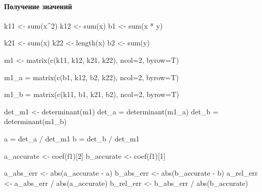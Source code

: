 \documentclass[
  letterpaper,
  DIV=11,
  numbers=noendperiod]{scrartcl}
\let\oldparagraph\paragraph
\renewcommand{\paragraph}[1]{\oldparagraph{#1}\mbox{}}
\newenvironment{Shaded}{\begin{snugshade}}{\end{snugshade}}
\newcommand{\AttributeTok}[1]{\textcolor[rgb]{0.40,0.45,0.13}{#1}}
\newcommand{\DecValTok}[1]{\textcolor[rgb]{0.68,0.00,0.00}{#1}}
\newcommand{\FunctionTok}[1]{\textcolor[rgb]{0.28,0.35,0.67}{#1}}
\newcommand{\NormalTok}[1]{\textcolor[rgb]{0.00,0.23,0.31}{#1}}
\newcommand{\OtherTok}[1]{\textcolor[rgb]{0.00,0.23,0.31}{#1}}
\newcommand{\SpecialCharTok}[1]{\textcolor[rgb]{0.37,0.37,0.37}{#1}}
\begin{document}
\paragraph{Получение
значений}\label{ux43fux43eux43bux443ux447ux435ux43dux438ux435-ux437ux43dux430ux447ux435ux43dux438ux439}

\begin{Shaded}
\begin{Highlighting}[]
\NormalTok{k11 }\OtherTok{\textless{}{-}} \FunctionTok{sum}\NormalTok{(x}\SpecialCharTok{\^{}}\DecValTok{2}\NormalTok{)}
\NormalTok{k12 }\OtherTok{\textless{}{-}} \FunctionTok{sum}\NormalTok{(x)}
\NormalTok{b1  }\OtherTok{\textless{}{-}} \FunctionTok{sum}\NormalTok{(x }\SpecialCharTok{*}\NormalTok{ y)}

\NormalTok{k21 }\OtherTok{\textless{}{-}} \FunctionTok{sum}\NormalTok{(x)}
\NormalTok{k22 }\OtherTok{\textless{}{-}} \FunctionTok{length}\NormalTok{(x)}
\NormalTok{b2  }\OtherTok{\textless{}{-}} \FunctionTok{sum}\NormalTok{(y)}

\NormalTok{m1 }\OtherTok{\textless{}{-}} \FunctionTok{matrix}\NormalTok{(}\FunctionTok{c}\NormalTok{(k11, k12,}
\NormalTok{               k21, k22), }\AttributeTok{ncol=}\DecValTok{2}\NormalTok{, }\AttributeTok{byrow=}\NormalTok{T)}


\NormalTok{m1\_a }\OtherTok{=} \FunctionTok{matrix}\NormalTok{(}\FunctionTok{c}\NormalTok{(b1, k12,}
\NormalTok{                b2, k22), }\AttributeTok{ncol=}\DecValTok{2}\NormalTok{, }\AttributeTok{byrow=}\NormalTok{T)}

\NormalTok{m1\_b }\OtherTok{=} \FunctionTok{matrix}\NormalTok{(}\FunctionTok{c}\NormalTok{(k11, b1,}
\NormalTok{                k21, b2), }\AttributeTok{ncol=}\DecValTok{2}\NormalTok{, }\AttributeTok{byrow=}\NormalTok{T)}

\NormalTok{det\_m1 }\OtherTok{\textless{}{-}} \FunctionTok{determinant}\NormalTok{(m1)}
\NormalTok{det\_a }\OtherTok{=} \FunctionTok{determinant}\NormalTok{(m1\_a)}
\NormalTok{det\_b }\OtherTok{=} \FunctionTok{determinant}\NormalTok{(m1\_b)}

\NormalTok{a }\OtherTok{=}\NormalTok{ det\_a }\SpecialCharTok{/}\NormalTok{ det\_m1}
\NormalTok{b }\OtherTok{=}\NormalTok{ det\_b }\SpecialCharTok{/}\NormalTok{ det\_m1}

\NormalTok{a\_accurate }\OtherTok{\textless{}{-}} \FunctionTok{coef}\NormalTok{(f1)[}\DecValTok{2}\NormalTok{]}
\NormalTok{b\_accurate }\OtherTok{\textless{}{-}} \FunctionTok{coef}\NormalTok{(f1)[}\DecValTok{1}\NormalTok{]}

\NormalTok{a\_abs\_err }\OtherTok{\textless{}{-}} \FunctionTok{abs}\NormalTok{(a\_accurate }\SpecialCharTok{{-}}\NormalTok{ a)}
\NormalTok{b\_abs\_err }\OtherTok{\textless{}{-}} \FunctionTok{abs}\NormalTok{(b\_accurate }\SpecialCharTok{{-}}\NormalTok{ b)}
\NormalTok{a\_rel\_err }\OtherTok{\textless{}{-}}\NormalTok{ a\_abs\_err }\SpecialCharTok{/} \FunctionTok{abs}\NormalTok{(a\_accurate)}
\NormalTok{b\_rel\_err }\OtherTok{\textless{}{-}}\NormalTok{ b\_abs\_err }\SpecialCharTok{/} \FunctionTok{abs}\NormalTok{(b\_accurate)}
\end{Highlighting}
\end{Shaded}
\end{document}
